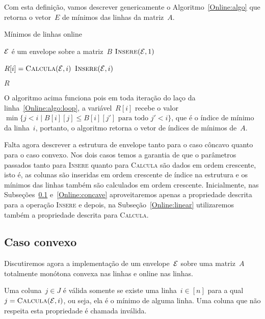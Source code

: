 Com esta definição, vamos descrever genericamente o Algoritmo~\ref{Online:algo} que retorna o vetor~$E$ de mínimos das linhas da matriz~$A$.

\begin{algorithm}[h]
\caption{Mínimos de linhas online}
\label{Online:algo}
\begin{algorithmic}[1]
    \State $\mathcal{E}$ é um envelope sobre a matriz~$B$
    \State $\textsc{Insere}(\mathcal{E},1)$

     \label{Online:algo:loop}
        \State $R[i] = \textsc{Calcula}(\mathcal{E},i)$
        \State $\textsc{Insere}(\mathcal{E},i)$
    \EndFor

    \State \Return $R$
\EndFunction
\end{algorithmic}
\end{algorithm}

O algoritmo acima funciona pois em toda iteração do laço da linha~\ref{Online:algo:loop}, a variável~$R[i]$ recebe o valor~$\min\{ j < i \mid B[i][j] \leq B[i][j'] \text{ para todo } j' < i\}$, que é o índice de mínimo da linha~$i$, portanto, o algoritmo retorna o vetor de índices de mínimos de~$A$.

Falta agora descrever a estrutura de envelope tanto para o caso côncavo quanto para o caso convexo. Nos dois casos temos a garantia de que o parâmetros passados tanto para \textsc{Insere} quanto para \textsc{Calcula} são dados em ordem crescente, isto é, as colunas são inseridas em ordem crescente de índice na estrutura e os mínimos das linhas também são calculados em ordem crescente. Inicialmente, nas Subseções~\ref{Online:convex} e~\ref{Online:concave} aproveitaremos apenas a propriedade descrita para a operação \textsc{Insere} e depois, na Subseção~\ref{Online:linear} utilizaremos também a propriedade descrita para \textsc{Calcula}.


\subsection{Caso convexo} \label{Online:convex}
Discutiremos agora a implementação de um envelope~$\mathcal{E}$ sobre uma matriz~$A$ totalmente monótona convexa nas linhas e online nas linhas. 

\begin{defi}
Uma coluna~$j \in J$ é válida somente se existe uma linha~$i \in [n]$ para a qual~${j = \textsc{Calcula}(\mathcal{E},i)}$, ou seja, ela é o mínimo de alguma linha. Uma coluna que não respeita esta propriedade é chamada inválida.
\end{defi}

